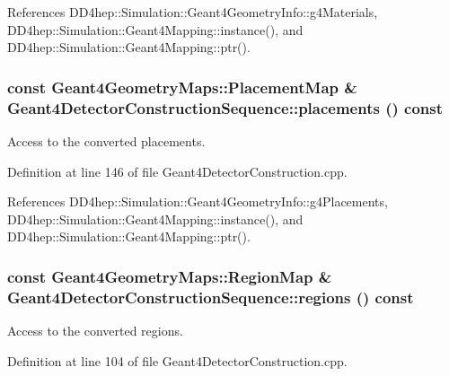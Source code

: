 References DD4hep::Simulation::Geant4GeometryInfo::g4Materials, DD4hep::Simulation::Geant4Mapping::instance(), and DD4hep::Simulation::Geant4Mapping::ptr().\hypertarget{class_d_d4hep_1_1_simulation_1_1_geant4_detector_construction_sequence_a58bd5c2c34f328ecb506084ba1a8f4a3}{
\subsubsection[{placements}]{\setlength{\rightskip}{0pt plus 5cm}const {\bf Geant4GeometryMaps::PlacementMap} \& Geant4DetectorConstructionSequence::placements () const}}
\label{class_d_d4hep_1_1_simulation_1_1_geant4_detector_construction_sequence_a58bd5c2c34f328ecb506084ba1a8f4a3}


Access to the converted placements. 

Definition at line 146 of file Geant4DetectorConstruction.cpp.

References DD4hep::Simulation::Geant4GeometryInfo::g4Placements, DD4hep::Simulation::Geant4Mapping::instance(), and DD4hep::Simulation::Geant4Mapping::ptr().\hypertarget{class_d_d4hep_1_1_simulation_1_1_geant4_detector_construction_sequence_a88b08b2719f3da5bc1a8d4c398c74169}{
\subsubsection[{regions}]{\setlength{\rightskip}{0pt plus 5cm}const {\bf Geant4GeometryMaps::RegionMap} \& Geant4DetectorConstructionSequence::regions () const}}
\label{class_d_d4hep_1_1_simulation_1_1_geant4_detector_construction_sequence_a88b08b2719f3da5bc1a8d4c398c74169}


Access to the converted regions. 

Definition at line 104 of file Geant4DetectorConstruction.cpp.

